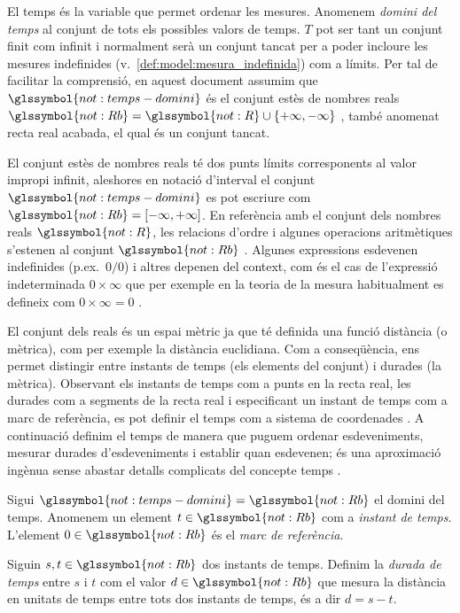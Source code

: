 El temps és la variable que permet ordenar les mesures.  Anomenem
\emph{domini del temps} al conjunt  de
tots els possibles valors de temps. $T$ pot ser tant un conjunt finit
com infinit i normalment serà un conjunt tancat %
per a poder incloure les mesures indefinides (v.\
\autoref{def:model:mesura_indefinida}) com a límits.  Per tal de
facilitar la comprensió, en aquest document assumim que
$\glssymbol{not:temps-domini}$ és el conjunt estès de nombres reals
$\glssymbol{not:Rb} = \glssymbol{not:R} \cup
\{+\infty,-\infty\}$ \parencite{wiki:extendedreal,cantrell:extendedreal},
també anomenat recta real acabada, el qual és un conjunt tancat.


El conjunt estès de nombres reals té dos punts límits corresponents al
valor impropi infinit, aleshores en notació d'interval el conjunt
$\glssymbol{not:temps-domini}$ es pot escriure com $\glssymbol{not:Rb}
= [-\infty,+\infty]$. En referència amb el conjunt dels nombres reals
$\glssymbol{not:R}$, les relacions d'ordre i algunes operacions
aritmètiques s'estenen al conjunt $\glssymbol{not:Rb}$
\parencite{cantrell:extendedreal}.  Algunes expressions esdevenen
indefinides (p.ex.\ $0/0$) i altres depenen del context, com és el cas
de l'expressió indeterminada $0 \times \infty$ que per exemple en la
teoria de la mesura habitualment es defineix com $0 \times \infty =
0$ \parencite{wiki:extendedreal}.


El conjunt dels reals és un espai mètric ja que té definida una funció
distància (o mètrica), com per exemple la distància euclidiana. Com a
conseqüència, ens permet distingir entre instants de temps (els
elements del conjunt) i durades (la mètrica). Observant els instants
de temps com a punts en la recta real, les durades com a segments de
la recta real i especificant un instant de temps com a marc de
referència, es pot definir el temps com a sistema de
coordenades \parencite{iep:time-supplement,kopetz11:realtime}. A
continuació definim el temps de manera que puguem ordenar
esdeveniments, mesurar durades d'esdeveniments i establir quan
esdevenen; és una aproximació ingènua sense abastar detalls complicats
del concepte temps \parencite{iep:time}.


\begin{definition}[Temps]
  \label{def:model:temps}
  Sigui $\glssymbol{not:temps-domini}=\glssymbol{not:Rb}$ el domini del temps.
  Anomenem un element $t\in\glssymbol{not:Rb}$ com a \emph{instant de temps}.
  L'element $0\in\glssymbol{not:Rb}$ és el \emph{marc de referència}.

  Siguin $s,t\in\glssymbol{not:Rb}$ dos instants de temps.  Definim la
  \emph{durada de temps} entre $s$ i $t$ com el valor $d \in\glssymbol{not:Rb}$
  que mesura la distància en unitats de temps entre tots dos instants
  de temps, és a dir $d= s-t$.


\end{definition}

